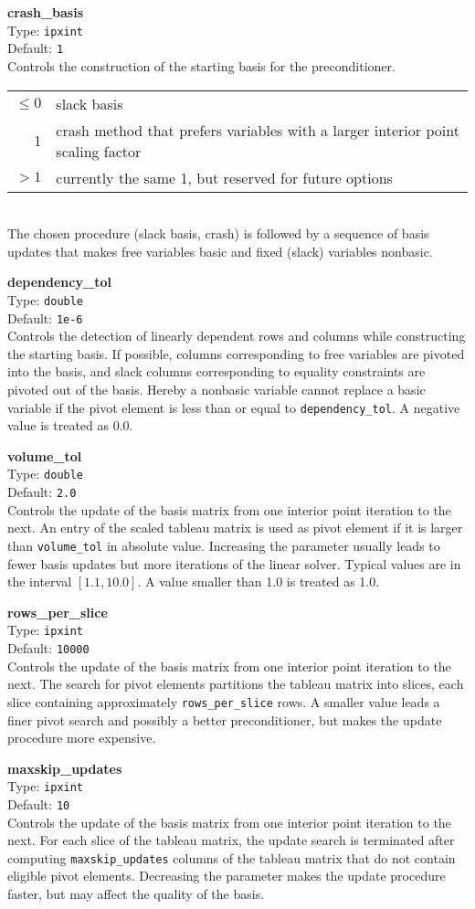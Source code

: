 \documentclass{article}
\newcommand{\ct}{\texttt}
\newcommand{\param}[4]{
  \noindent\begin{minipage}{\textwidth}
    \textbf{#1}\\
    Type: \ct{#2}\\
    Default: \ct{#3}\\
    #4
  \end{minipage}
  \vskip 1\baselineskip
}
\begin{document}
\param{crash\_basis}{ipxint}{1}{
  Controls the construction of the starting basis for the preconditioner. \\
  \begin{tabular}{rl}
    $\le0$ & slack basis \\
    1 & crash method that prefers variables with a larger interior point scaling
    factor \\
    $>1$ & currently the same 1, but reserved for future options
  \end{tabular} \\
  The chosen procedure (slack basis, crash) is followed by a sequence of basis
  updates that makes free variables basic and fixed (slack) variables nonbasic.
}

\param{dependency\_tol}{double}{1e-6}{
  Controls the detection of linearly dependent rows and columns while
  constructing the starting basis. If possible, columns corresponding to free
  variables are pivoted into the basis, and slack columns corresponding to
  equality constraints are pivoted out of the basis. Hereby a nonbasic variable
  cannot replace a basic variable if the pivot element is less than or equal to
  \ct{dependency\_tol}. A negative value is treated as 0.0.
}

\param{volume\_tol}{double}{2.0}{
  Controls the update of the basis matrix from one interior point iteration to
  the next. An entry of the scaled tableau matrix is used as pivot element if it
  is larger than \ct{volume\_tol} in absolute value. Increasing the parameter
  usually leads to fewer basis updates but more iterations of the linear solver.
  Typical values are in the interval $[1.1,10.0]$. A value smaller than 1.0 is
  treated as 1.0.
}

\param{rows\_per\_slice}{ipxint}{10000}{
  Controls the update of the basis matrix from one interior point iteration to
  the next. The search for pivot elements partitions the tableau matrix into
  slices, each slice containing approximately \ct{rows\_per\_slice} rows. A
  smaller value leads a finer pivot search and possibly a better preconditioner,
  but makes the update procedure more expensive.
}

\param{maxskip\_updates}{ipxint}{10}{
  Controls the update of the basis matrix from one interior point iteration to
  the next. For each slice of the tableau matrix, the update search is
  terminated after computing \ct{maxskip\_updates} columns of the tableau matrix
  that do not contain eligible pivot elements. Decreasing the parameter makes
  the update procedure faster, but may affect the quality of the basis.
}
\end{document}
